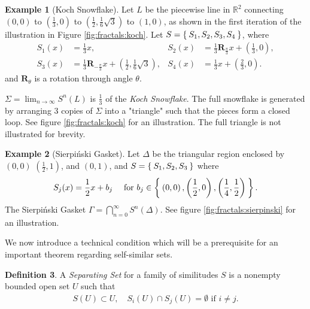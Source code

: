 \documentclass[11pt]{amsart}
\theoremstyle{definition}
\newtheorem{definition}{Definition}[section]
\newtheorem{example}[definition]{Example}
\newcommand{\R}{\ensuremath{\mathbb{R}}}
\begin{document}
\begin{example}[Koch Snowflake]
	Let \( L \) be the piecewise line in \( \R^2 \) connecting \( (0,0) \) to \( (\frac{1}{3}, 0) \) to \( (\frac{1}{2}, \frac{1}{6}\sqrt{3}) \) to \( (1,0) \), as shown in the first iteration of the illustration in Figure \ref{fig:fractals:koch}. Let \( S = \Set{S_1, S_2, S_3, S_4} \), where
	\begin{align}
		S_1(x) & = \frac{1}{3}x,
		& S_2(x) & = \frac{1}{3}\textbf{R}_{\frac{\pi}{3}}x + \left( \frac{1}{3}, 0 \right), \\
		S_3(x) & = \frac{1}{3}\textbf{R}_{-\frac{\pi}{3}}x + \left( \frac{1}{2}, \frac{1}{6} \sqrt{3} \right),
		& S_4(x) & = \frac{1}{3}x + \left( \frac{2}{3}, 0 \right) .
	\end{align}
	and \( \textbf{R}_\theta \) is a rotation through angle \( \theta \). 
	
	\( \Sigma = \lim_{n \rightarrow \infty} S^n(L) \) is \( \frac{1}{3} \) of the \textit{Koch Snowflake}. The full snowflake is generated by arranging 3 copies of \(\Sigma\) into a "triangle" such that the pieces form a closed loop. See figure \ref{fig:fractals:koch} for an illustration. The full triangle is not illustrated for brevity.
\end{example}

\begin{example}[Sierpiński Gasket]
		Let \( \Delta \) be the triangular region enclosed by \((0,0)\) \((\frac{1}{2}, 1)\), and \((0, 1)\), and \( S = \Set{S_1, S_2, S_3} \) where
	\begin{align}
		S_j(x) = \frac{1}{2} x + b_j \quad \text{ for } b_j \in \Set{\left( 0, 0 \right), \left( \frac{1}{2}, 0 \right), \left(\frac{1}{4}, \frac{1}{2}\right)} .
	\end{align}
	The Sierpiński Gasket \( \Gamma = \bigcap_{n = 0}^{\infty} S^n(\Delta) \). 
	See figure \ref{fig:fractals:sierpinski} for an illustration.
\end{example}


We now introduce a technical condition which will be a prerequisite for an important theorem regarding self-similar sets.

\begin{definition}
	A \textit{Separating Set} for a family of similitudes \( S \) is a nonempty bounded open set \(U\) such that
	\begin{align}
		S(U) \subset U,
		\quad S_i(U) \cap S_j(U) = \emptyset \text{ if } i \neq j .
	\end{align}
\end{definition}
\end{document}
